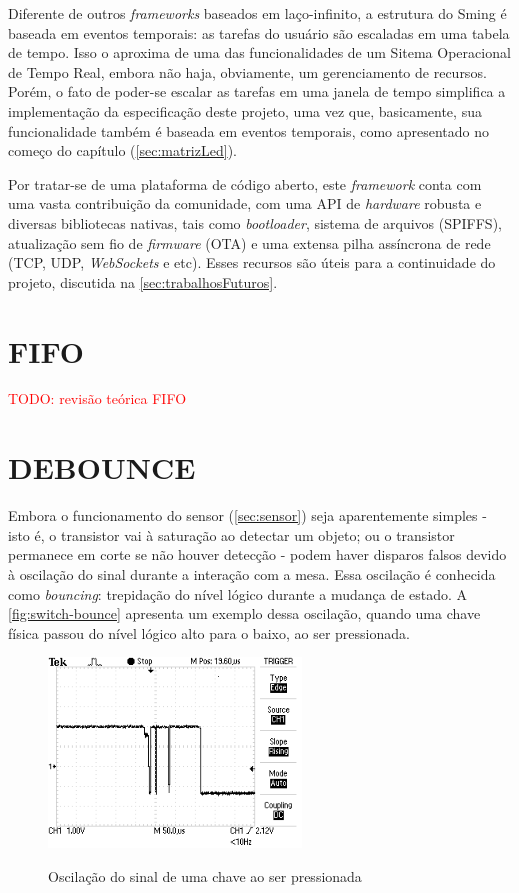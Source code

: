 Diferente de outros \emph{frameworks} baseados em laço-infinito, a estrutura do Sming é baseada em eventos temporais: as tarefas do usuário são escaladas em uma tabela de tempo. Isso o aproxima de uma das funcionalidades de um Sitema Operacional de Tempo Real, embora não haja, obviamente, um gerenciamento de recursos. Porém, o fato de poder-se escalar as tarefas em uma janela de tempo simplifica a implementação da especificação deste projeto, uma vez que, basicamente, sua funcionalidade também é baseada em eventos temporais, como apresentado no começo do capítulo (\autoref{sec:matrizLed}).

Por tratar-se de uma plataforma de código aberto, este \emph{framework} conta com uma vasta contribuição da comunidade, com uma API de \emph{hardware} robusta e diversas bibliotecas nativas, tais como \emph{bootloader}, sistema de arquivos (SPIFFS), atualização sem fio de \emph{firmware} (OTA) e uma extensa pilha assíncrona de rede (TCP, UDP, \emph{WebSockets} e etc). Esses recursos são úteis para a continuidade do projeto, discutida na \autoref{sec:trabalhosFuturos}.

\section{FIFO}
\label{sec:fifo}

\textcolor{red}{TODO: revisão teórica FIFO}

\section{DEBOUNCE}
\label{sec:debounce}

Embora o funcionamento do sensor (\autoref{sec:sensor}) seja aparentemente simples - isto é, o transistor vai à saturação ao detectar um objeto; ou o transistor permanece em corte se não houver detecção - podem haver disparos falsos devido à oscilação do sinal durante a interação com a mesa. Essa oscilação é conhecida como \emph{bouncing}: trepidação do nível lógico durante a mudança de estado. A \autoref{fig:switch-bounce} apresenta um exemplo dessa oscilação, quando uma chave física passou do nível lógico alto para o baixo, ao ser pressionada.

\begin{figure}[H]
    \centering
    \caption{Oscilação do sinal de uma chave ao ser pressionada}
    \includegraphics[width=0.6\textwidth]{./dados/figuras/bounce}
    \label{fig:switch-bounce}
\end{figure}

